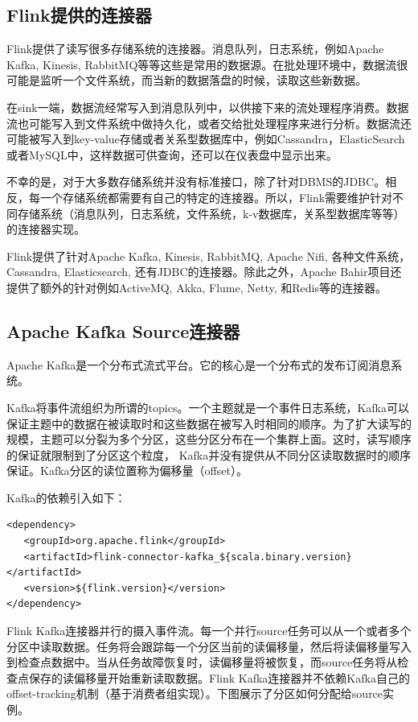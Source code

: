 \documentclass[cn,11pt,chinese]{elegantbook}
\begin{document}
\subsection{Flink提供的连接器}

Flink提供了读写很多存储系统的连接器。消息队列，日志系统，例如Apache Kafka, Kinesis, RabbitMQ等等这些是常用的数据源。在批处理环境中，数据流很可能是监听一个文件系统，而当新的数据落盘的时候，读取这些新数据。

在sink一端，数据流经常写入到消息队列中，以供接下来的流处理程序消费。数据流也可能写入到文件系统中做持久化，或者交给批处理程序来进行分析。数据流还可能被写入到key-value存储或者关系型数据库中，例如Cassandra，ElasticSearch或者MySQL中，这样数据可供查询，还可以在仪表盘中显示出来。

不幸的是，对于大多数存储系统并没有标准接口，除了针对DBMS的JDBC。相反，每一个存储系统都需要有自己的特定的连接器。所以，Flink需要维护针对不同存储系统（消息队列，日志系统，文件系统，k-v数据库，关系型数据库等等）的连接器实现。

Flink提供了针对Apache Kafka, Kinesis, RabbitMQ, Apache Nifi, 各种文件系统，Cassandra, Elasticsearch, 还有JDBC的连接器。除此之外，Apache Bahir项目还提供了额外的针对例如ActiveMQ, Akka, Flume, Netty, 和Redis等的连接器。

\subsection{Apache Kafka Source连接器}

Apache Kafka是一个分布式流式平台。它的核心是一个分布式的发布订阅消息系统。

Kafka将事件流组织为所谓的topics。一个主题就是一个事件日志系统，Kafka可以保证主题中的数据在被读取时和这些数据在被写入时相同的顺序。为了扩大读写的规模，主题可以分裂为多个分区，这些分区分布在一个集群上面。这时，读写顺序的保证就限制到了分区这个粒度， Kafka并没有提供从不同分区读取数据时的顺序保证。Kafka分区的读位置称为偏移量（offset）。

Kafka的依赖引入如下：

\begin{verbatim}
<dependency>
   <groupId>org.apache.flink</groupId>
   <artifactId>flink-connector-kafka_${scala.binary.version}</artifactId>
   <version>${flink.version}</version>
</dependency>
\end{verbatim}

Flink Kafka连接器并行的摄入事件流。每一个并行source任务可以从一个或者多个分区中读取数据。任务将会跟踪每一个分区当前的读偏移量，然后将读偏移量写入到检查点数据中。当从任务故障恢复时，读偏移量将被恢复，而source任务将从检查点保存的读偏移量开始重新读取数据。Flink Kafka连接器并不依赖Kafka自己的offset-tracking机制（基于消费者组实现）。下图展示了分区如何分配给source实例。
\end{document}
